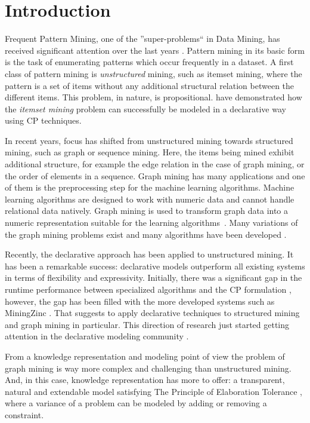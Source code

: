 \section{Introduction}
Frequent Pattern Mining, one of the ''super-problems`` in Data Mining, has received significant attention over the last years \citep{pattern_mining_book}. Pattern mining in its basic form is the task of enumerating patterns which occur frequently in a dataset.
A first class of pattern mining is \emph{unstructured} mining, such as itemset mining, where the pattern is a set of items without any additional structural relation between the different items.
This problem, in nature, is propositional.
\citet{tias_original} have demonstrated how the \emph{itemset mining} problem can successfully be modeled in a declarative way using CP techniques.

In recent years, focus has shifted from unstructured mining towards structured mining, such as graph or sequence mining.
Here, the items being mined exhibit additional structure, for example the edge relation in the case of graph mining, or the order of elements in a sequence. Graph mining has many applications and one of them is the preprocessing step for the machine learning algorithms. Machine learning algorithms are designed to work with numeric data and cannot handle relational data natively. Graph mining is used to transform graph data into a numeric representation suitable for the learning algorithms~\citep{pattern_mining_classification}. Many variations of the graph mining problems exist \citep{subtree_overview} and many algorithms have been developed \citep{gspan,theta_subsumption}.

Recently, the declarative approach has been applied to unstructured mining. It has been a remarkable success: declarative models outperform all existing systems in terms of flexibility and expressivity. Initially, there was a significant gap in the runtime performance between specialized algorithms and the CP formulation \citep{tias_original,mining_cp_extra}, however, the gap has been filled with the more developed systems such as MiningZinc \citep{tias_declarative_pattern_mining}. That suggests to apply declarative techniques to structured mining and graph mining in particular. This direction of research just started getting attention in the declarative modeling community \citep{cp_sequence_mining,ilp_graph_mining}. 

From a knowledge representation and modeling point of view the problem of graph mining is way more complex and challenging than unstructured mining. And, in this case, knowledge representation has more to offer: a transparent, natural and extendable model satisfying The Principle of Elaboration Tolerance \citep{elaboration_tolerance}, where a variance of a problem can be modeled by adding or removing a constraint. 

